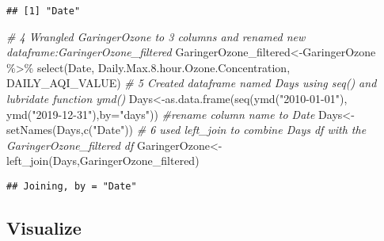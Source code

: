 \documentclass[
]{article}
\newenvironment{Shaded}{\begin{snugshade}}{\end{snugshade}}
\newcommand{\AttributeTok}[1]{\textcolor[rgb]{0.77,0.63,0.00}{#1}}
\newcommand{\CommentTok}[1]{\textcolor[rgb]{0.56,0.35,0.01}{\textit{#1}}}
\newcommand{\FloatTok}[1]{\textcolor[rgb]{0.00,0.00,0.81}{#1}}
\newcommand{\FunctionTok}[1]{\textcolor[rgb]{0.00,0.00,0.00}{#1}}
\newcommand{\NormalTok}[1]{#1}
\newcommand{\OtherTok}[1]{\textcolor[rgb]{0.56,0.35,0.01}{#1}}
\newcommand{\SpecialCharTok}[1]{\textcolor[rgb]{0.00,0.00,0.00}{#1}}
\newcommand{\StringTok}[1]{\textcolor[rgb]{0.31,0.60,0.02}{#1}}
\begin{document}
\begin{Shaded}
\end{Shaded}

\begin{verbatim}
## [1] "Date"
\end{verbatim}

\begin{Shaded}
\begin{Highlighting}[]
\CommentTok{\# 4 Wrangled GaringerOzone to 3 columns and renamed new dataframe:GaringerOzone\_filtered}
\NormalTok{GaringerOzone\_filtered}\OtherTok{\textless{}{-}}\NormalTok{GaringerOzone }\SpecialCharTok{\%\textgreater{}\%}
                        \FunctionTok{select}\NormalTok{(Date, Daily.Max.}\FloatTok{8.}\NormalTok{hour.Ozone.Concentration,}
\NormalTok{                               DAILY\_AQI\_VALUE)}
\CommentTok{\# 5 Created dataframe named Days using seq() and lubridate function ymd()}
\NormalTok{Days}\OtherTok{\textless{}{-}}\FunctionTok{as.data.frame}\NormalTok{(}\FunctionTok{seq}\NormalTok{(}\FunctionTok{ymd}\NormalTok{(}\StringTok{"2010{-}01{-}01"}\NormalTok{), }\FunctionTok{ymd}\NormalTok{(}\StringTok{"2019{-}12{-}31"}\NormalTok{),}\AttributeTok{by=}\StringTok{"days"}\NormalTok{))}
\CommentTok{\#rename column name to Date }
\NormalTok{Days}\OtherTok{\textless{}{-}}\FunctionTok{setNames}\NormalTok{(Days,}\FunctionTok{c}\NormalTok{(}\StringTok{"Date"}\NormalTok{))}
\CommentTok{\# 6 used left\_join to combine Days df with the GaringerOzone\_filtered df}
\NormalTok{GaringerOzone}\OtherTok{\textless{}{-}}\FunctionTok{left\_join}\NormalTok{(Days,GaringerOzone\_filtered)}
\end{Highlighting}
\end{Shaded}

\begin{verbatim}
## Joining, by = "Date"
\end{verbatim}

\hypertarget{visualize}{%
\subsection{Visualize}\label{visualize}}
\end{document}
